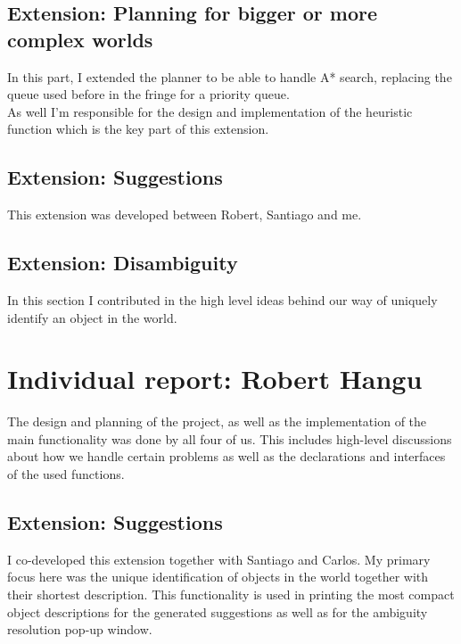 \documentclass[11pt]{article}
\begin{document}
\subsection{Extension: Planning for bigger or more complex worlds}

In this part, I extended the planner to be able to handle A* search, replacing 
the queue used before in the fringe for a priority queue.  \\

As well I'm responsible for the design and implementation of the heuristic 
function which is the key part of this extension.  \\

\subsection{Extension: Suggestions}

This extension was developed between Robert, Santiago and me.  \\

\subsection{Extension: Disambiguity}

In this section I contributed in the high level ideas behind our way of 
uniquely identify an object in the world.  \\

\section{Individual report: Robert Hangu}

The design and planning of the project, as well as the implementation of 
the main functionality was done by all four of us. This includes high-level 
discussions about how we handle certain problems as well as the declarations 
and interfaces of the used functions.

\subsection{Extension: Suggestions}

I co-developed this extension together with Santiago and Carlos. My primary 
focus here was the unique identification of objects in the world together with 
their shortest description. This functionality is used in printing the most 
compact object descriptions for the generated suggestions as well as for the 
ambiguity resolution pop-up window.
\end{document}
